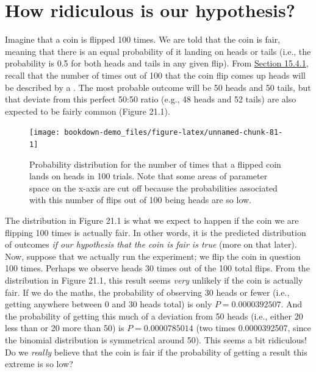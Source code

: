 \documentclass[
  openany]{krantz}
\begin{document}
\hypertarget{how-ridiculous-is-our-hypothesis}{%
\section{How ridiculous is our hypothesis?}\label{how-ridiculous-is-our-hypothesis}}

Imagine that a coin is flipped 100 times.
We are told that the coin is fair, meaning that there is an equal probability of it landing on heads or tails (i.e., the probability is 0.5 for both heads and tails in any given flip).
From \protect\hyperlink{Chapter_15.htmlux5cux23binomial-distribution}{Section 15.4.1}, recall that the number of times out of 100 that the coin flip comes up heads will be described by a .
The most probable outcome will be 50 heads and 50 tails, but  that deviate from this perfect 50:50 ratio (e.g., 48 heads and 52 tails) are also expected to be fairly common (Figure 21.1).

\begin{figure}
\texttt{[image: bookdown-demo\_files/figure-latex/unnamed-chunk-81-1]} \caption{Probability distribution for the number of times that a flipped coin lands on heads in 100 trials. Note that some areas of parameter space on the x-axis are cut off because the probabilities associated with this number of flips out of 100 being heads are so low.}\label{fig:unnamed-chunk-81}
\end{figure}

The distribution in Figure 21.1 is what we expect to happen if the coin we are flipping 100 times is actually fair.
In other words, it is the predicted distribution of outcomes \emph{if our hypothesis that the coin is fair is true} (more on that later).
Now, suppose that we actually run the experiment; we flip the coin in question 100 times.
Perhaps we observe heads 30 times out of the 100 total flips.
From the distribution in Figure 21.1, this result seems \emph{very} unlikely if the coin is actually fair.
If we do the maths, the probability of observing 30 heads or fewer (i.e., getting anywhere between 0 and 30 heads total) is only \(P = 0.0000392507\).
And the probability of getting this much of a deviation from 50 heads (i.e., either 20 less than or 20 more than 50) is \(P = 0.0000785014\) (two times 0.0000392507, since the binomial distribution is symmetrical around 50).
This seems a bit ridiculous!
Do we \emph{really} believe that the coin is fair if the probability of getting a result this extreme is so low?
\end{document}
